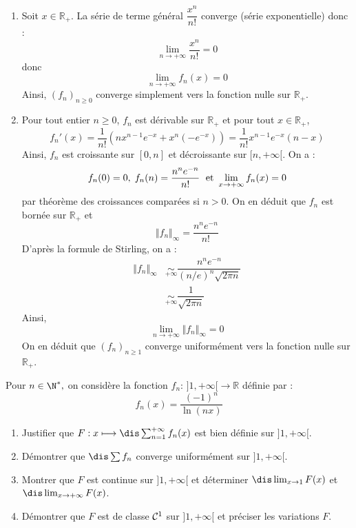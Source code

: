 \documentclass[a4paper,10pt]{report}
\begin{document}
\corr 

\begin{enumerate}
\item Soit $x \in \mathbb{R}_+$. La série de terme général $\dfrac{x^n}{n!}$ converge (série exponentielle) donc :
$$ \lim_{n \rightarrow + \infty}  \frac{x^n}{n!} = 0$$
donc 
$$ \lim_{n \rightarrow + \infty} f_n(x)=0$$
Ainsi, $(f_n)_{n \geq 0}$ converge simplement vers la fonction nulle sur $\mathbb{R}_+$.
\item Pour tout entier $n \geq 0$, $f_n$ est dérivable sur $\mathbb{R}_+$ et pour tout $x \in \mathbb{R}_+$,
$$ f_n'(x) = \dfrac{1}{n!} (nx^{n-1} e^{-x} + x^n (-e^{-x})) = \dfrac{1}{n!} x^{n-1} e^{-x} (n-x)$$
Ainsi, $f_n$ est croissante sur $[0,n]$ et décroissante sur $[n,+ \infty[$. On a :
$$ f_n(0)=0, \; f_n(n) = \dfrac{n^n e^{-n}}{n!} \; \hbox{ et } \lim_{x \rightarrow + \infty} f_n(x) = 0$$
par théorème des croissances comparées si $n>0$. On en déduit que $f_n$ est bornée sur $\mathbb{R}_+$ et 
$$ \Vert f_n \Vert_{\infty} = \dfrac{n^n e^{-n}}{n!}$$
D'après la formule de Stirling, on a :
\begin{align*}
 \Vert f_n \Vert_{\infty} & \underset{+ \infty}{\sim} \dfrac{n^n e^{-n}}{(n/e)^n \sqrt{2 \pi n}} \\
 & \underset{+ \infty}{\sim} \dfrac{1}{\sqrt{2 \pi n}} 
\end{align*}
Ainsi,
$$ \lim_{n \rightarrow + \infty} \Vert f_n \Vert_{\infty} = 0$$
On en déduit que $(f_n)_{n \geq 1}$ converge uniformément vers la fonction nulle sur $\mathbb{R}_+$.
\end{enumerate}

\begin{Exercice}{} Pour $n\in\N^*,$ on considère la fonction $f_n : \, ] 1,+\infty[ \rightarrow \mathbb{R}$ définie par :
$$ f_n(x)=\frac{(-1)^n}{\ln(nx)}$$

\begin{enumerate}
	\item Justifier que $F : x\longmapsto \dis\sum_{n=1}^{+\infty} f_n(x)$ est bien définie sur $]1,+\infty[.$
	
	\item Démontrer que $\dis\sum f_n$ converge uniformément sur $]1,+\infty[.$ 
	
	\item Montrer que $F$ est continue sur $]1,+\infty[$ et déterminer $\dis\lim_{x \rightarrow 1}F(x)$ et  $\dis\lim_{x \rightarrow  +\infty}F(x)$.
	
	\item Démontrer que $F$ est de classe ${\cal C}^1$ sur $]1,+\infty[$ et préciser les variations $F.$
\end{enumerate}
\end{Exercice}
\end{document}
